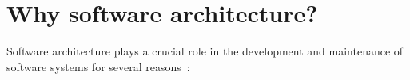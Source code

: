 


\section{Why software architecture?}

Software architecture plays a crucial role in the development and maintenance of software systems for several reasons~\cite{openai2023chatgpt}:

